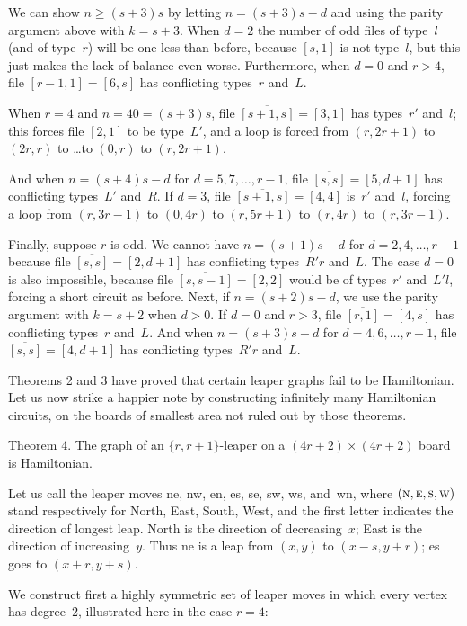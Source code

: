 We can show $n\geq (s+3)s$ by letting $n=(s+3)s-d$ and using the parity
argument above with $k=s+3$. When $d=2$ the number of odd files of type~$l$
(and of type~$r$) will be one less than before, because $[s,1]$ is not
type~$l$, but this just makes the lack of balance even worse. Furthermore, when
$d=0$ and $r>4$, file $\overline{[r-1,1]}=[6,s]$ has conflicting types~$r$
and~$L$.

When $r=4$ and $n=40=(s+3)s$, file $\overline{[s+1,s]}=[3,1]$ has types~$r'$
and~$l$; this forces file $[2,1]$ to be type~$L'$, and a loop is forced from
$(r,2r+1)$ to $(2r,r)$ to \dots to $(0,r)$ to $(r,2r+1)$. 

And when $n=(s+4)s-d$ for $d=5,7,\ldots,r-1$, file $\overline{[s,s]}=[5,d+1]$
has conflicting types~$L'$ and~$R$. 
If $d=3$, file $\overline{[s+1,s]}=[4,4]$ is~$r'$ and~$l$, forcing a loop from
$(r,3r-1)$ to $(0,4r)$ to $(r,5r+1)$ to $(r,4r)$ to $(r,3r-1)$. 

Finally, suppose $r$ is odd. We cannot have $n=(s+1)s-d$ for $d=2,4,\ldots,r-1$
because file $\overline{[s,s]}=[2,d+1]$ has conflicting types~$R'r$ and~$L$.
The case $d=0$ is also impossible, because file $\overline{[s,s-1]}=[2,2]$
would be of types~$r'$ and~$L'l$, forcing a short circuit as before. Next, if
$n=(s+2)s-d$, we use the parity argument with $k=s+2$ when $d>0$. If $d=0$ and
$r>3$, file $\overline{[r,1]}=[4,s]$ has conflicting types~$r$ and~$L$. And
when $n=(s+3)s-d$ for $d=4,6,\ldots,r-1$, file $\overline{[s,s]}=[4,d+1]$ has
conflicting types~$R'r$ and~$L$. \ \pfbox

\medskip
Theorems 2 and 3 have proved that certain leaper graphs fail to be Hamiltonian.
Let us now strike a happier note by constructing infinitely many Hamiltonian
circuits, on the boards of smallest area not ruled out by those theorems.

\proclaim
Theorem 4. The graph of an $\{r,r+1\}$-leaper on a $(4r+2)\times (4r+2)$ board
is Hamiltonian.

\proof
Let us call the leaper moves {\sc ne}, {\sc nw}, {\sc en},
{\sc es}, {\sc se}, {\sc sw}, {\sc ws}, and~{\sc wn},
where $(\hbox{\sc n},\hbox{\sc e},\hbox{\sc s},\hbox{\sc w})$
 stand respectively for North, East, South, West, and the first letter
indicates the direction of longest leap. North is the direction of
decreasing~$x$; East is the direction of increasing~$y$. Thus {\sc ne}
 is a leap from $(x,y)$ to $(x-s,y+r)$; {\sc es} goes to $(x+r,y+s)$. 

We construct first a highly symmetric set of leaper moves in which every vertex
has degree~2, illustrated here in the case $r=4$:

